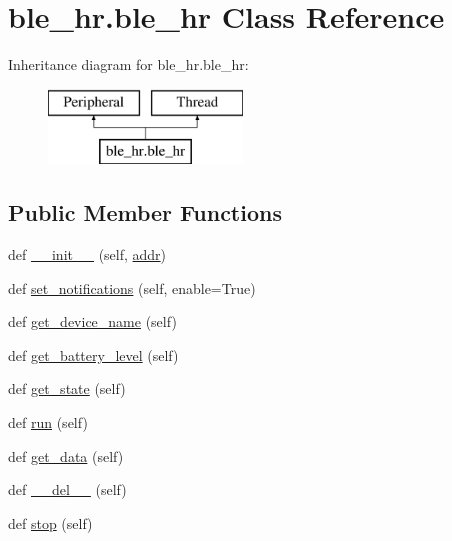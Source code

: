 \hypertarget{classble__hr_1_1ble__hr}{}\section{ble\+\_\+hr.\+ble\+\_\+hr Class Reference}
\label{classble__hr_1_1ble__hr}
Inheritance diagram for ble\+\_\+hr.\+ble\+\_\+hr\+:\begin{figure}[H]
\begin{center}
\leavevmode
\includegraphics[height=2.000000cm]{classble__hr_1_1ble__hr}
\end{center}
\end{figure}
\subsection*{Public Member Functions}
\begin{DoxyCompactItemize}
\item 
def \hyperlink{classble__hr_1_1ble__hr_af31908249a7579dbdd49df718a789dde}{\+\_\+\+\_\+init\+\_\+\+\_\+} (self, \hyperlink{classble__hr_1_1ble__hr_a57de0d26c0ef685006b704485bc80902}{addr})
\item 
def \hyperlink{classble__hr_1_1ble__hr_a4a5d2a824ad6a9d6d5ed21eaca3e4079}{set\+\_\+notifications} (self, enable=True)
\item 
def \hyperlink{classble__hr_1_1ble__hr_a7d26889af16df11894dacc699d8794fa}{get\+\_\+device\+\_\+name} (self)
\item 
def \hyperlink{classble__hr_1_1ble__hr_aaed07642915896a2ed8cb1c5c6601e9a}{get\+\_\+battery\+\_\+level} (self)
\item 
def \hyperlink{classble__hr_1_1ble__hr_a9d66a38fa21117b6fa70683b8cefeb7d}{get\+\_\+state} (self)
\item 
def \hyperlink{classble__hr_1_1ble__hr_aa64424b260416362b4c248f62092b722}{run} (self)
\item 
def \hyperlink{classble__hr_1_1ble__hr_a95ed9d67bcd7143ec6b6fd52c03d98dc}{get\+\_\+data} (self)
\item 
def \hyperlink{classble__hr_1_1ble__hr_a3fa494427d7fd43856c5e31d37535827}{\+\_\+\+\_\+del\+\_\+\+\_\+} (self)
\item 
def \hyperlink{classble__hr_1_1ble__hr_a68b20bb308e103a3b9a2249d80c17c8b}{stop} (self)
\end{DoxyCompactItemize}
